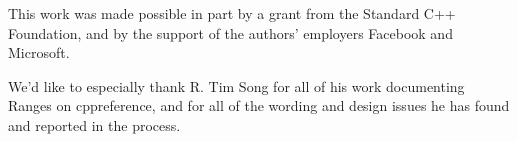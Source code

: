 \setcounter{chapter}{0}

This work was made possible in part by a grant from the Standard C++
Foundation, and by the support of the authors' employers Facebook and Microsoft.

We'd like to especially thank R. Tim Song for all of his work documenting Ranges
on cppreference, and for all of the wording and design issues he has found and
reported in the process.
